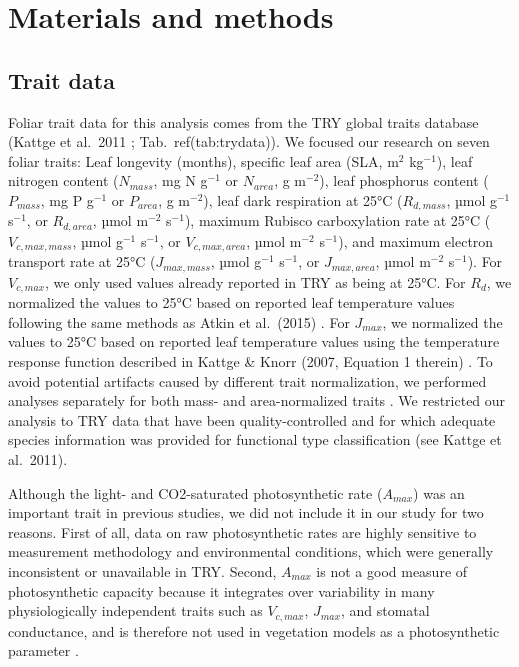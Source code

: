 \section{Materials and methods}
\label{sec:mvtraits-methods}

\subsection{Trait data}

Foliar trait data for this analysis comes from the TRY global traits database (Kattge et al.~2011 \nocite{kattge_try_2011}; Tab.\ ref(tab:trydata)).
We focused our research on seven foliar traits:
Leaf longevity (months),
specific leaf area (SLA, m$^2$ kg$^{-1}$),
leaf nitrogen content ($N_{mass}$, mg N g$^{-1}$ or $N_{area}$, g m$^{-2}$),
leaf phosphorus content ($P_{mass}$, mg P g$^{-1}$ or $P_{area}$, g m$^{-2}$),
leaf dark respiration at 25°C ($R_{d,mass}$, µmol g$^{-1}$ s$^{-1}$, or $R_{d,area}$, µmol m$^{-2}$ s$^{-1}$),
maximum Rubisco carboxylation rate at 25°C ($V_{c,max,mass}$, µmol g$^{-1}$ s$^{-1}$, or $V_{c,max,area}$, µmol m$^{-2}$ s$^{-1}$),
and maximum electron transport rate at 25°C ($J_{max,mass}$, µmol g$^{-1}$ s$^{-1}$, or $J_{max,area}$, µmol m$^{-2}$ s$^{-1}$).
For $V_{c,max}$, we only used values already reported in TRY as being at 25°C.
For $R_{d}$, we normalized the values to 25°C based on reported leaf temperature values following the same methods as Atkin et al.~(2015) \nocite{atkin_global_2015}.
For $J_{max}$, we normalized the values to 25°C based on reported leaf temperature values using the temperature response function described in Kattge \& Knorr (2007, Equation 1 therein) \nocite{kattge_2007_temperature}.
To avoid potential artifacts caused by different trait normalization, we performed analyses separately for both mass- and area-normalized traits \cite{osnas_global_2013,lloyd_les}.
We restricted our analysis to TRY data that have been quality-controlled and for which adequate species information was provided for functional type classification (see Kattge et al.~2011).\nocite{kattge_try_2011}

Although the light- and CO2-saturated photosynthetic rate ($A_{max}$) was an important trait in previous studies, we did not include it in our study for two reasons.
First of all, data on raw photosynthetic rates are highly sensitive to measurement methodology and environmental conditions, which were generally inconsistent or unavailable in TRY.
Second, $A_{max}$ is not a good measure of photosynthetic capacity because it integrates over variability in many physiologically independent traits such as $V_{c,max}$, $J_{max}$, and stomatal conductance, and is therefore not used in vegetation models as a photosynthetic parameter \cite{Ali_2015}.

